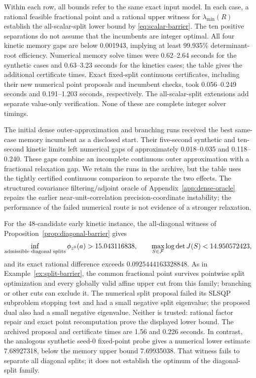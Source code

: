 Within each row, all bounds refer to the same exact input model. In each
case, a rational feasible fractional point and a rational upper witness for
$\lambda_{\min}(R)$ establish the all-scalar-split lower bound by
\eqref{eq:scalar-barrier}. The ten positive separations do not assume that
the incumbents are integer optimal. All four kinetic memory gaps are below
0.001943, implying at least 99.935\% determinant-root efficiency.
Numerical memory solve times were 0.62--2.64 seconds for the synthetic cases
and 0.63--3.23 seconds for the kinetics cases; the table gives the additional
certificate times. Exact fixed-split continuous certificates, including their
new numerical point proposals and incumbent checks, took 0.056--0.249 seconds
and 0.191--1.203 seconds, respectively. The all-scalar-split extensions add
separate value-only verification. None of these are complete integer solver
timings.

The initial dense outer-approximation and branching runs received the best
same-case memory incumbent as a disclosed start. Their five-second synthetic
and ten-second kinetic limits left numerical gaps of approximately
0.018--0.035 and 0.118--0.240. These gaps combine an incomplete continuous
outer approximation with a fractional relaxation gap. We retain the runs in
the archive, but the table uses the tightly certified continuous comparison
to separate the two effects. The structured covariance filtering/adjoint
oracle of Appendix~\ref{app:dense-oracle} repairs the earlier
near-unit-correlation precision-coordinate instability; the performance of
the failed numerical route is not evidence of a stronger relaxation.

For the 48-candidate early kinetic instance, the all-diagonal witness of
Proposition~\ref{prop:diagonal-barrier} gives
\begin{equation}\label{eq:kinetic-diagonal-separation}
 \inf_{\text{admissible diagonal splits}}
    \phi_{z^0}(a)>15.043116838,
 \qquad \max_{S\in\mathcal F}\log\det J(S)<14.950572423,
\end{equation}
and its exact rational difference exceeds $0.0925444163328848$.
As in Example~\ref{ex:split-barrier}, the common fractional point survives
pointwise split optimization and every globally valid affine upper cut from
this family; branching or other cuts can exclude it. The numerical
split proposal failed its SLSQP subproblem stopping test and had a small
negative split eigenvalue; the proposed dual also had a small negative
eigenvalue. Neither is trusted: rational factor repair and exact point
recomputation prove the displayed lower bound. The archived proposal and
certificate times are 1.56 and 0.226 seconds. In contrast, the analogous
synthetic seed-0 fixed-point probe gives a numerical lower estimate 7.68927318,
below the memory upper bound 7.69935038. That witness fails to separate all
diagonal splits; it does not establish the optimum of the diagonal-split family.

